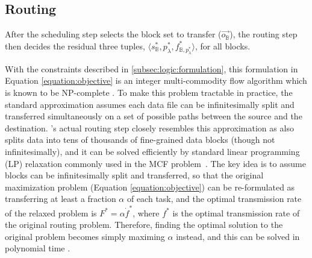 \subsection{Routing}
\label{subsec:logic:routing}

After the scheduling step selects the block set to transfer ($\overrightarrow{o_\mathbb{B}}$), the routing step then decides the residual three tuples, $\langle s_{\mathbb{B}}^*, p_{\lambda}^*, f^*_{\mathbb{B},p_{\lambda}^*} \rangle$, for all blocks.%

With the constraints described in \Section\ref{subsec:logic:formulation}, this formulation in Equation \ref{equation:objective} is an integer multi-commodity flow algorithm which is known to be NP-complete \cite{garg1997primal}.
To make this problem tractable in practice,
the standard approximation assumes each data file can be infinitesimally split and transferred simultaneously on a set of possible paths between the source and the destination.
\name's actual routing step closely resembles this approximation as \name also splits data into tens of thousands of fine-grained data blocks (though not infinitesimally), and it can be solved efficiently by standard linear programming (LP) relaxation commonly used in the MCF problem~\cite{garg2007faster,reed2012traffic}.
The key idea is to assume blocks can be infinitesimally split and transferred, so that the original maximization problem (Equation \ref{equation:objective}) can be re-formulated as transferring at least a fraction $\alpha$ of each task,%
and the optimal transmission rate of the relaxed problem is $F^*=\alpha\dot f^*$, where $f^*$ is the optimal transmission rate of the original routing problem.
Therefore, finding the optimal solution to the original problem becomes simply maximing $\alpha$ instead, and this can be solved in polynomial time \cite{reed2012traffic}.

